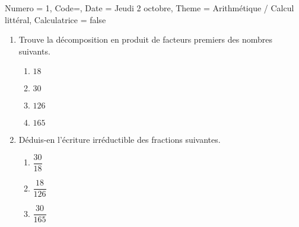\documentclass[11pt]{article}
\begin{document}
\begin{Maquette}[IE]{
        Numero = 1, Code={}, Date = Jeudi 2 octobre, Theme = Arithmétique / Calcul littéral, Calculatrice = false
    }
\begin{multicols}{2}
\begin{exercice}
\begin{enumerate}
            \end{enumerate}
        \end{exercice}
        \columnbreak
        \begin{exercice}
            \begin{enumerate}
                \item Trouve la décomposition en produit de facteurs premiers des nombres suivants.
                      \begin{multicols}{2}
                          \begin{enumerate}[label=\textbf{\alph*.}]
                              \item $18$
                              \item $30$
                              \item $126$
                              \item $165$
                          \end{enumerate}
                      \end{multicols}
                \item Déduis-en l’écriture irréductible des fractions suivantes.
                      \begin{multicols}{3}
                          \begin{enumerate}[label=\textbf{\alph*.}]
                              \item $\dfrac{30}{18}$
                              \item $\dfrac{18}{126}$
                              \item $\dfrac{30}{165}$
                          \end{enumerate}
                      \end{multicols}
                      \vspace{.5em}
            \end{enumerate}
        \end{exercice}
        

\end{multicols}
\end{Maquette}
\end{document}
